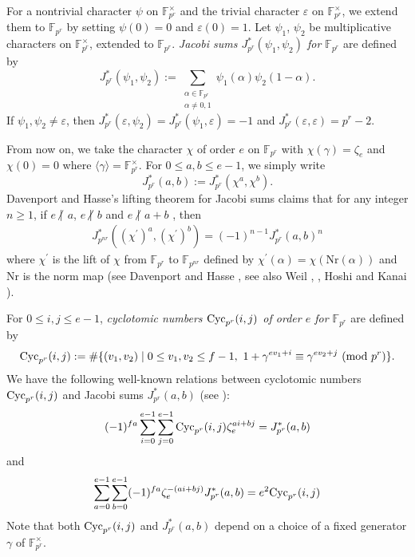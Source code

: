\documentclass[a4paper, 11pt]{amsart}
\newcommand{\notmid}{\mathrel{\ooalign{$\mkern-5mu\not$\crcr$|$}}}
\newcommand{\F}{\mathbb F}
\theoremstyle{plain}
\theoremstyle{definition}
\numberwithin{equation}{section}
\begin{document}
For a nontrivial character $\psi$ on $\F_{p^r}^{\times}$ and 
the trivial character $\varepsilon$ on $\F_{p^r}^{\times}$, 
we extend them to $\F_{p^r}$ by setting $\psi(0)=0$ and $\varepsilon(0)=1$. 
Let $\psi_1$, $\psi_2$ be multiplicative characters on $\F_{p^{r}}^{\times}$, extended to $\F_{p^r}$. 
{\it Jacobi sums $J_{p^r}^{\ast}(\psi_1,\psi_2)$ for $\F_{p^r}$} are defined by
\[
J_{p^r}^{\ast}(\psi_1,\psi_2):=\sum_{\substack{\alpha \in \F_{p^r}\\ \alpha \neq 0,1}}\psi_1(\alpha)\psi_2(1-\alpha).
\]
If $\psi_1, \psi_2 \neq \varepsilon$, then 
$J_{p^r}^{\ast}(\varepsilon,\psi_2)=J_{p^r}^{\ast}(\psi_1, \varepsilon)=-1$ and 
$J_{p^r}^{\ast}(\varepsilon, \varepsilon)=p^r-2$.

From now on, we take the character $\chi$ of order $e$ 
on $\F_{p^r}$ with $\chi(\gamma)=\zeta_e$ and $\chi(0)=0$ 
where $\langle\gamma\rangle=\F_{p^r}^\times$. 
For $0 \leq a,b \leq e-1$, 
we simply write 
\[
J_{p^r}^{\ast}(a,b):=J_{p^r}^{\ast}(\chi^a,\chi^b).
\]
Davenport and Hasse's lifting theorem for Jacobi sums claims that 
for any integer $n \geq 1$, if $e$ $\notmid$ $a$, $e$ $\notmid$ $b$ and $e$ $\notmid$ $a+b$ , then
\begin{align*}
J_{p^{nr}}^{\ast}((\chi^{\prime})^a, (\chi^{\prime})^b)=(-1)^{n-1}J_{p^r}^{\ast}(a, b)^n
\end{align*}
where $\chi^{\prime}$ is the lift of $\chi$ 
from $\F_{p^r}$ to $\F_{p^{nr}}$ defined by 
$\chi^{\prime}(\alpha) = \chi(\mathrm{Nr}(\alpha))$ 
and $\mathrm{Nr}$ is the norm map 
(see Davenport and Hasse \cite[Relation (0.8)]{DH35}, 
see also Weil \cite[pages 503--506]{Wei49}, \cite[pages 360--362, Theorem~11.5.2, Corollary~11.5.3]{BEW98}, Hoshi and Kanai \cite[Section 1]{HK22}). 

For $0 \leq i,j \leq e-1$, 
{\it cyclotomic numbers ${\rm Cyc}_{p^r}(i,j)$ of order $e$ for $\F_{p^r}$} 
are defined by
\begin{align*}
{\rm Cyc}_{p^r}(i,j) :=\# \{ (v_1, v_2) \mid 0 \leq v_1, v_2 \leq f-1, \ 1+\gamma^{ev_1+i} \equiv \gamma^{ev_2+j} \ ({\rm mod}\ p^r) \}.
\end{align*}
We have the following well-known 
relations between cyclotomic numbers ${\rm Cyc}_{p^r}(i,j)$ 
and Jacobi sums $J_{p^r}^{\ast}(a,b)$ 
(see \cite[page 79, Theorem~2.5.1]{BEW98}):
\begin{align}\label{eq:Jr-Cycr}
(-1)^{fa}\sum_{i=0}^{e-1} \sum_{j=0}^{e-1} {\rm Cyc}_{p^r}(i,j) \zeta_e^{ai+bj}=J_{p^r}^{\ast}(a,b)
\end{align}
and
\begin{align}\label{eq:Cycr-Jr}
\sum_{a=0}^{e-1} \sum_{b=0}^{e-1} (-1)^{fa} \zeta_e^{-(ai+bj)}J_{p^r}^{\ast}(a,b)=e^2{\rm Cyc}_{p^r}(i,j) 
\end{align}
Note that both ${\rm Cyc}_{p^r}(i,j)$ and $J_{p^r}^{\ast}(a,b)$ 
depend on a choice of a fixed generator $\gamma$ of $\F_{p^{r}}^{\times}$. 
\end{document}
